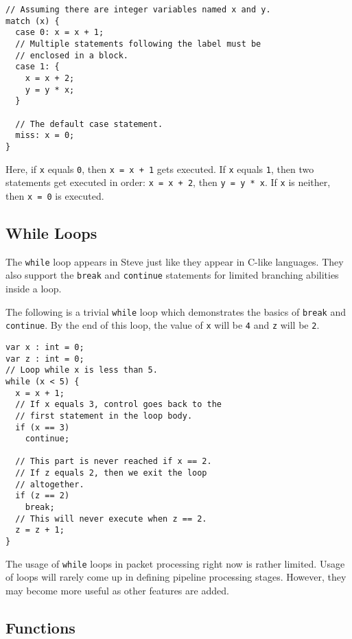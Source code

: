 \begin{codepage}
\begin{lstlisting}
// Assuming there are integer variables named x and y.
match (x) {
  case 0: x = x + 1;
  // Multiple statements following the label must be
  // enclosed in a block.
  case 1: {
    x = x + 2;
    y = y * x;
  }

  // The default case statement.
  miss: x = 0;
}
\end{lstlisting}
\end{codepage}

Here, if \texttt{x} equals \texttt{0}, then \texttt{x = x + 1} gets executed. If
\texttt{x} equals \texttt{1}, then two statements get executed in order:
\texttt{x = x + 2}, then \texttt{y = y * x}. If \texttt{x} is neither, then
\texttt{x = 0} is executed.

\subsection{While Loops} \label{tut:while}

The \texttt{while} loop appears in Steve just like they appear in C-like languages. 
They also support the \texttt{break} and \texttt{continue} statements for limited
branching abilities inside a loop.

The following is a trivial \texttt{while} loop which demonstrates the basics
of \texttt{break} and \texttt{continue}. By the end of this loop, the value of \texttt{x} will be \texttt{4} and \texttt{z} will be \texttt{2}.

\begin{codepage}
\begin{lstlisting}
var x : int = 0;
var z : int = 0;
// Loop while x is less than 5.
while (x < 5) {
  x = x + 1;
  // If x equals 3, control goes back to the
  // first statement in the loop body.
  if (x == 3)
    continue;

  // This part is never reached if x == 2.
  // If z equals 2, then we exit the loop
  // altogether.
  if (z == 2)
    break;
  // This will never execute when z == 2.
  z = z + 1;
}
\end{lstlisting}
\end{codepage}

The usage of \texttt{while} loops in packet processing right now is rather limited. Usage
of loops will rarely come up in defining pipeline processing stages. However,
they may become more useful as other features are added.

\subsection{Functions} \label{tut:function}

